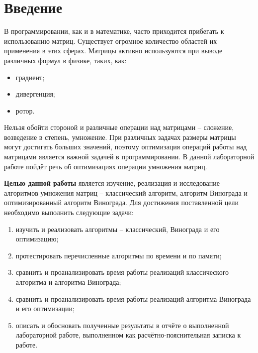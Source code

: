 \chapter*{Введение}

В программировании, как и в математике, часто приходится прибегать к использованию матриц.
Существует огромное количество областей их применения в этих сферах.
Матрицы активно используются при выводе различных формул в физике, таких, как:
\begin{itemize}
    \item градиент;
    \item дивергенция;
    \item ротор.
\end{itemize}

Нельзя обойти стороной и различные операции над матрицами -- сложение, возведение в степень, умножение.
При различных задачах размеры матрицы могут достигать больших значений, поэтому оптимизация операций работы над матрицами является важной задачей в программировании.
В данной лабораторной работе пойдёт речь об оптимизациях операции умножения матриц.


\textbf{Целью данной работы} является изучение, реализация и исследование алгоритмов умножения матриц -- классический алгоритм, алгоритм Винограда и оптимизированный алгоритм Винограда.
Для достижения поставленной цели необходимо выполнить следующие задачи:
\begin{enumerate}[label=\arabic*)]
	\item изучить и реализовать алгоритмы -- классический, Винограда и его оптимизацию;
    \item протестировать перечисленные алгоритмы по времени и по памяти;
    \item сравнить и проанализировать время работы реализаций классического алгоритма и алгоритма Винограда;
    \item сравнить и проанализировать время работы реализаций алгоритма Винограда и его оптимизации;
	\item описать и обосновать полученные результаты в отчёте о выполненной лабораторной работе, выполненном как расчётно-пояснительная записка к работе.
\end{enumerate}
